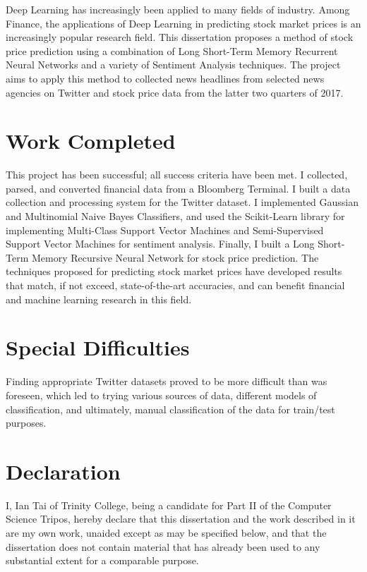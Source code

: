 \documentclass[12pt,a4paper,twoside,openright]{report}
\begin{document}
Deep Learning has increasingly been applied to many fields of industry. Among Finance,
the applications of Deep Learning in predicting stock market prices is an increasingly
popular research field. This dissertation proposes a method of stock price prediction
using a combination of Long Short-Term Memory Recurrent Neural Networks and a variety
of Sentiment Analysis techniques. The project aims to apply this method to collected 
news headlines from selected news agencies on Twitter and stock price data from the 
latter two quarters of 2017.

\section*{Work Completed}

This project has been successful; all success criteria have been met. I collected, parsed, and converted
financial data from a Bloomberg Terminal. I 
built a data collection and processing system for the Twitter dataset. I implemented
Gaussian and Multinomial Naive Bayes Classifiers, and used the
Scikit-Learn library for implementing Multi-Class Support Vector Machines and
Semi-Supervised Support Vector Machines for sentiment analysis. Finally, I built
a Long Short-Term Memory Recursive Neural Network for stock price prediction. The techniques
proposed for predicting stock market prices have developed results that match, if not exceed,
state-of-the-art accuracies, and can benefit financial and machine learning research in this field.

\section*{Special Difficulties}

Finding appropriate Twitter datasets proved to be more difficult than was foreseen, which led to
trying various sources of data, different models of classification, and ultimately, manual classification
of the data for train/test purposes.
 
\newpage
\section*{Declaration}

I, Ian Tai of Trinity College, being a candidate for Part II of the Computer
Science Tripos, hereby declare
that this dissertation and the work described in it are my own work,
unaided except as may be specified below, and that the dissertation
does not contain material that has already been used to any substantial
extent for a comparable purpose.
\end{document}
